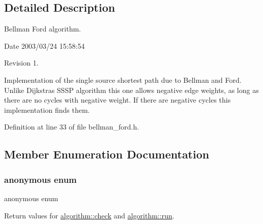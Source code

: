 \subsection{Detailed Description}
Bellman Ford algorithm. 

\begin{DoxyParagraph}{Date}
2003/03/24 15\+:58\+:54 
\end{DoxyParagraph}
\begin{DoxyParagraph}{Revision}
1. 
\end{DoxyParagraph}


Implementation of the single source shortest path due to Bellman and Ford. Unlike Dijkstra\textquotesingle{}s S\+S\+SP algorithm this one allows negative edge weights, as long as there are no cycles with negative weight. If there are negative cycles this implementation finds them. 

Definition at line 33 of file bellman\+\_\+ford.\+h.



\subsection{Member Enumeration Documentation}
\mbox{\label{classalgorithm_af1a0078e153aa99c24f9bdf0d97f6710}} 
\subsubsection{\texorpdfstring{anonymous enum}{anonymous enum}}
{\footnotesize\ttfamily anonymous enum\hspace{0.3cm}{\ttfamily [inherited]}}



Return values for \mbox{\hyperlink{classalgorithm_a76361fb03ad1cf643affc51821e43bed}{algorithm\+::check}} and \mbox{\hyperlink{classalgorithm_a734b189509a8d6b56b65f8ff772d43ca}{algorithm\+::run}}. 

